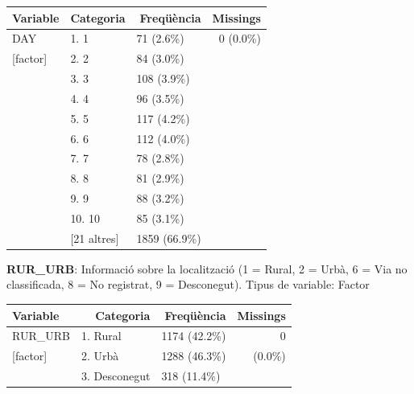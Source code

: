 \documentclass[11pt,longbibliography]{article}
\theoremstyle{definition}
\theoremstyle{remark}
\begin{document}
\begin{table}[H]
\centering
\begin{tabular}{lllr}
\hline
Variable     & \multicolumn{1}{r}{Categoria} & \multicolumn{1}{r}{Freqüència} & Missings  \\ \hline
DAY          & 1. 1                          & 71 (2.6\%)                     & 0 (0.0\%) \\
{[}factor{]} & 2. 2                          & 84 (3.0\%)                     &           \\
             & 3. 3                          & 108 (3.9\%)                    &           \\
             & 4. 4                          & 96 (3.5\%)                     &           \\
             & 5. 5                          & 117 (4.2\%)                    &           \\
             & 6. 6                          & 112 (4.0\%)                    &           \\
             & 7. 7                          & 78 (2.8\%)                     &           \\
             & 8. 8                          & 81 (2.9\%)                     &           \\
             & 9. 9                          & 88 (3.2\%)                     &           \\
             & 10. 10                        & 85 (3.1\%)                     &           \\
             & {[}21 altres{]}               & 1859 (66.9\%)                  &           \\ \hline
\end{tabular}
\end{table}


\textbf{RUR\_URB}: Informació sobre la localització (1 = Rural, 2 = Urbà, 6 = Via no classificada, 8 = No registrat, 9 = Desconegut). Tipus de variable: Factor

\begin{table}[H]
\centering
\begin{tabular}{lllr}
\hline
Variable     & \multicolumn{1}{r}{Categoria} & \multicolumn{1}{r}{Freqüència} & Missings  \\ \hline
RUR\_URB     & 1. Rural                      & 1174 (42.2\%)                  & 0  \\
{[}factor{]} & 2. Urbà                       & 1288 (46.3\%)                  &      (0.0\%)     \\
             & 3. Desconegut                 & 318 (11.4\%)                   &           \\ \hline
\end{tabular}
\end{table}
\end{document}
